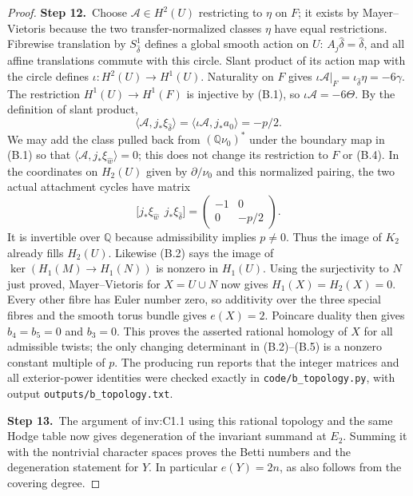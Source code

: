 \begin{proof}
\par\smallskip\noindent\textbf{Step 12.}\ Choose $\mathcal A\in H^2(U)$ restricting to $\eta$ on $F$;
it exists by Mayer--Vietoris because the two transfer-normalized
classes $\eta$ have equal restrictions. Fibrewise translation by
$S^1_{\hat\delta}$ defines a global smooth action on $U$:
$A_j\hat\delta=\hat\delta$, and all affine translations commute
with this circle. Slant product of its action map with the circle
defines $\iota:H^2(U)\to H^1(U)$. Naturality on $F$ gives
$\iota\mathcal A|_F=\iota_{\hat\delta}\eta=-6\gamma$.
The restriction $H^1(U)\to H^1(F)$ is injective by (B.1), so
$\iota\mathcal A=-6\Theta$. By the definition of slant product,
\[
 \langle\mathcal A,j_*\xi_{\hat\delta}\rangle
 =\langle\iota\mathcal A,j_*a_0\rangle=-p/2.           \tag{B.4}
\]
We may add the class pulled back from $(\mathbb Q\nu_0)^*$ under
the boundary map in (B.1) so that
$\langle\mathcal A,j_*\xi_{\hat w}\rangle=0$;
this does not change its restriction to $F$ or (B.4).
In the coordinates on $H_2(U)$ given by $\partial/\nu_0$ and
this normalized pairing, the two actual attachment cycles have
matrix
\[
 \bigl[j_*\xi_{\hat w}\ \ j_*\xi_{\hat\delta}\bigr]
 =\begin{pmatrix}-1&0\\0&-p/2\end{pmatrix}.             \tag{B.5}
\]
It is invertible over $\mathbb Q$ because admissibility implies
$p\ne0$. Thus the image of $K_2$ already fills $H_2(U)$.
Likewise (B.2) says the image of $\ker(H_1(M)\to H_1(N))$
is nonzero in $H_1(U)$. Using the surjectivity to $N$ just proved,
Mayer--Vietoris for $X=U\cup N$ now gives $H_1(X)=H_2(X)=0$.
Every other fibre has Euler number zero, so additivity over the
three special fibres and the smooth torus bundle gives $e(X)=2$.
Poincare duality then gives $b_4=b_5=0$ and $b_3=0$.
This proves the asserted rational homology of $X$ for all admissible
twists; the only changing determinant in (B.2)--(B.5) is a nonzero
constant multiple of $p$. The producing run reports that the integer matrices and all exterior-power identities were checked exactly in \texttt{code/b\_topology.py},
with output \texttt{outputs/b\_topology.txt}.

\par\smallskip\noindent\textbf{Step 13.}\ The argument of inv:C1.1 using this rational topology and the same Hodge
table now gives degeneration of the invariant summand at $E_2$.
Summing it with the nontrivial character spaces proves the Betti
numbers and the degeneration statement for $Y$. In particular
$e(Y)=2n$, as also follows from the covering degree.
\end{proof}

